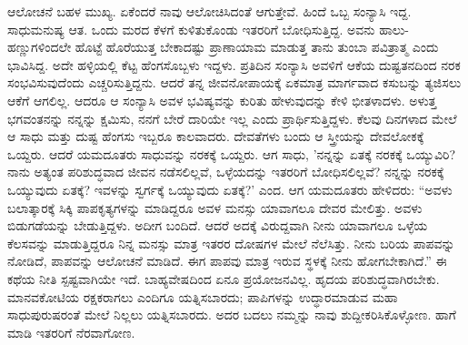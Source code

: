 ಆಲೋಚನೆ ಬಹಳ ಮುಖ್ಯ. ಏಕೆಂದರೆ ನಾವು ಆಲೋಚಿಸಿದಂತೆ ಆಗುತ್ತೇವೆ. ಹಿಂದೆ ಒಬ್ಬ ಸಂನ್ಯಾಸಿ ಇದ್ದ. ಸಾಧುಮನುಷ್ಯ ಆತ. ಒಂದು ಮರದ ಕೆಳಗೆ ಕುಳಿತುಕೊಂಡು ಇತರರಿಗೆ ಬೋಧಿಸುತ್ತಿದ್ದ. ಅವನು ಹಾಲು-ಹಣ್ಣುಗಳಿಂದಲೇ ಹೊಟ್ಟೆ ಹೊರೆಯುತ್ತ ಬೇಕಾದಷ್ಟು ಪ್ರಾಣಾಯಾಮ ಮಾಡುತ್ತ ತಾನು ತುಂಬಾ ಪವಿತ್ರಾತ್ಮ ಎಂದು ಭಾವಿಸಿದ್ದ. ಅದೇ ಹಳ್ಳಿಯಲ್ಲಿ ಕೆಟ್ಟ ಹೆಂಗಸೊಬ್ಬಳು ಇದ್ದಳು. ಪ್ರತಿದಿನ ಸಂನ್ಯಾಸಿ ಅವಳಿಗೆ ಆಕೆಯ ದುಷ್ಟತನದಿಂದ ನರಕ ಸಂಭವಿಸುವುದೆಂದು ಎಚ್ಚರಿಸುತ್ತಿದ್ದನು. ಆದರೆ ತನ್ನ ಜೀವನೋಪಾಯಕ್ಕೆ ಏಕಮಾತ್ರ ಮಾರ್ಗವಾದ ಕಸುಬನ್ನು ತ್ಯಜಿಸಲು ಆಕೆಗೆ ಆಗಲಿಲ್ಲ. ಆದರೂ ಆ ಸಂನ್ಯಾಸಿ ಅವಳ ಭವಿಷ್ಯವನ್ನು ಕುರಿತು ಹೇಳುವುದನ್ನು ಕೇಳಿ ಭೀತಳಾದಳು. ಅಳುತ್ತ ಭಗವಂತನನ್ನು ನನ್ನನ್ನು ಕ್ಷಮಿಸು, ನನಗೆ ಬೇರೆ ದಾರಿಯೇ ಇಲ್ಲ ಎಂದು ಪ್ರಾರ್ಥಿಸುತ್ತಿದ್ದಳು. ಕೆಲವು ದಿನಗಳಾದ ಮೇಲೆ ಆ ಸಾಧು ಮತ್ತು ದುಷ್ಟ ಹೆಂಗಸು ಇಬ್ಬರೂ ಕಾಲವಾದರು. ದೇವತೆಗಳು ಬಂದು ಆ ಸ್ತ್ರೀಯನ್ನು ದೇವಲೋಕಕ್ಕೆ ಒಯ್ದರು. ಆದರೆ ಯಮದೂತರು ಸಾಧುವನ್ನು ನರಕಕ್ಕೆ ಒಯ್ದರು. ಆಗ ಸಾಧು, 'ನನ್ನನ್ನು ಏತಕ್ಕೆ ನರಕಕ್ಕೆ ಒಯ್ಯುವಿರಿ? ನಾನು ಅತ್ಯಂತ ಪರಿಶುದ್ಧವಾದ ಜೀವನ ನಡೆಸಲಿಲ್ಲವೆ, ಒಳ್ಳೆಯದನ್ನು ಇತರರಿಗೆ ಬೋಧಿಸಲಿಲ್ಲವೆ? ನನ್ನನ್ನು ನರಕಕ್ಕೆ ಒಯ್ಯುವುದು ಏತಕ್ಕೆ? ಇವಳನ್ನು ಸ್ವರ್ಗಕ್ಕೆ ಒಯ್ಯುವುದು ಏತಕ್ಕೆ?' ಎಂದ. ಆಗ ಯಮದೂತರು ಹೇಳಿದರು: “ಅವಳು ಬಲಾತ್ಕಾರಕ್ಕೆ ಸಿಕ್ಕಿ ಪಾಪಕೃತ್ಯಗಳನ್ನು ಮಾಡಿದ್ದರೂ ಅವಳ ಮನಸ್ಸು ಯಾವಾಗಲೂ ದೇವರ ಮೇಲಿತ್ತು. ಅವಳು ಬಿಡುಗಡೆಯನ್ನು ಬೇಡುತ್ತಿದ್ದಳು. ಅದೀಗ ಬಂದಿದೆ. ಆದರೆ ಅದಕ್ಕೆ ವಿರುದ್ದವಾಗಿ ನೀನು ಯಾವಾಗಲೂ ಒಳ್ಳೆಯ ಕೆಲಸವನ್ನು ಮಾಡುತ್ತಿದ್ದರೂ ನಿನ್ನ ಮನಸ್ಸು ಮಾತ್ರ ಇತರರ ದೋಷಗಳ ಮೇಲೆ ನೆಲೆಸಿತ್ತು. ನೀನು ಬರಿಯ ಪಾಪವನ್ನು ನೋಡಿದೆ, ಪಾಪವನ್ನು ಆಲೋಚನೆ ಮಾಡಿದೆ. ಈಗ ಪಾಪವು ಮಾತ್ರ ಇರುವ ಸ್ಥಳಕ್ಕೆ ನೀನು ಹೋಗಬೇಕಾಗಿದೆ.'' ಈ ಕಥೆಯ ನೀತಿ ಸ್ಪಷ್ಟವಾಗಿಯೇ ಇದೆ. ಬಾಹ್ಯವೇಷದಿಂದ ಏನೂ ಪ್ರಯೋಜನವಿಲ್ಲ. ಹೃದಯ ಪರಿಶುದ್ಧವಾಗಿರಬೇಕು. ಮಾನವಕೋಟಿಯ ರಕ್ಷಕರಾಗಲು ಎಂದಿಗೂ ಯತ್ನಿಸಬಾರದು; ಪಾಪಿಗಳನ್ನು ಉದ್ಧಾರಮಾಡುವ ಮಹಾ ಸಾಧುಪುರುಷರಂತೆ ಮೇಲೆ ನಿಲ್ಲಲು ಯತ್ನಿಸಬಾರದು. ಅದರ ಬದಲು ನಮ್ಮನ್ನು ನಾವು ಶುದ್ದೀಕರಿಸಿಕೊಳ್ಳೋಣ. ಹಾಗೆ ಮಾಡಿ ಇತರರಿಗೆ ನೆರವಾಗೋಣ.

